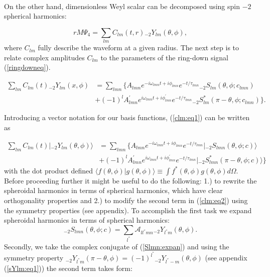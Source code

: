 \documentclass[11pt]{article}
\newcommand{\ket}[1]{|#1\rangle}
\newcommand{\braket}[2]{\langle #1|#2\rangle}
\begin{document}
\noindent\\
On the other hand, dimensionless Weyl scalar can be decomposed using spin $\minus 2$ spherical harmonics:

\begin{equation}
rM\Psi_4 = \sum_{lm} C_{lm}(t,r) {}_{\minus 2}Y_{lm}(\theta, \phi),
\end{equation} 
where $C_{lm}$ fully describe the waveform at a given radius. The next step is to relate complex amplitudes $C_{lm}$ to the parameters of the ring-down signal (\ref{ringdowneq}). 

\begin{equation} \label{clm:eq1}
\begin{aligned}
\sum_{lm} C_{lm}(t) {}_{\minus 2}Y_{lm}(x, \phi) & = \sum_{lmn} \Big\{ A_{lmn} e^{-i\omega_{lmn}t+i\phi_{lmn}}e^{-t/\tau_{lmn}} {}_{\minus 2}S_{lm}(\theta, \phi ;c_{lmn})\\
& + (-1)^l A^{'}_{lmn} e^{i\omega_{lmn}t+i\phi^{'}_{lmn}}e^{-t/\tau_{lmn}} {}_{\minus 2}S^{*}_{lm}(\pi-\theta, \phi; c_{lmn}) \Big\}.
\end{aligned}
\end{equation}

\noindent
Introducing a vector notation for our basis functions, (\ref{clm:eq1}) can be written as  

\begin{equation} \label{clm:eq2}
\begin{aligned}
\sum_{lm} C_{lm}(t) \ket{{}_{\minus 2}Y_{lm}(\theta, \phi)} & = \sum_{lmn} \Big\{ A_{lmn} e^{-i\omega_{lmn}t+i\phi_{lmn}}e^{-t/\tau_{lmn}} \ket{{}_{\minus 2}S_{lmn}(\theta, \phi ;c)}\\
& + (-1)^l A^{'}_{lmn} e^{i\omega_{lmn}t+i\phi^{'}_{lmn}}e^{-t/\tau_{lmn}} \ket{{}_{\minus 2}S^{*}_{lmn}(\pi-\theta, \phi; c)} \Big\}
\end{aligned}
\end{equation}
with the dot product defined $\braket{f(\theta, \phi)}{g(\theta, \phi)} \equiv \int{f^{*}(\theta, \phi) g(\theta, \phi) d\Omega}$. Before proceeding further it might be useful to do the following: 1.) to rewrite the spheroidal harmonics in terms of spherical harmonics, which have clear orthogonality properties and 2.) to modify the second term in (\ref{clm:eq2}) using the symmetry properties (see appendix). To accomplish the first task we expand spheroidal harmonics in terms of spherical harmonics:
\begin{equation} \label{Slmn:expan}
{}_{\minus 2}S_{lmn}(\theta, \phi ;c) = \sum_{l^{''}} \mathcal{A}_{ll^{''}mn} {}_{\minus 2}Y_{l^{''}m}(\theta, \phi).
\end{equation}
\noindent
Secondly, we take the complex conjugate of (\ref{Slmn:expan}) and using the symmetry property ${}_{\minus 2}Y_{l^{''}m}(\pi-\theta, \phi) = (-1)^{l^{''}} {}_{\minus 2}Y_{l^{''}-m}(\theta, \phi)$ (see appendix (\ref{sYlm:eq1})) the second term takes form:
\end{document}
